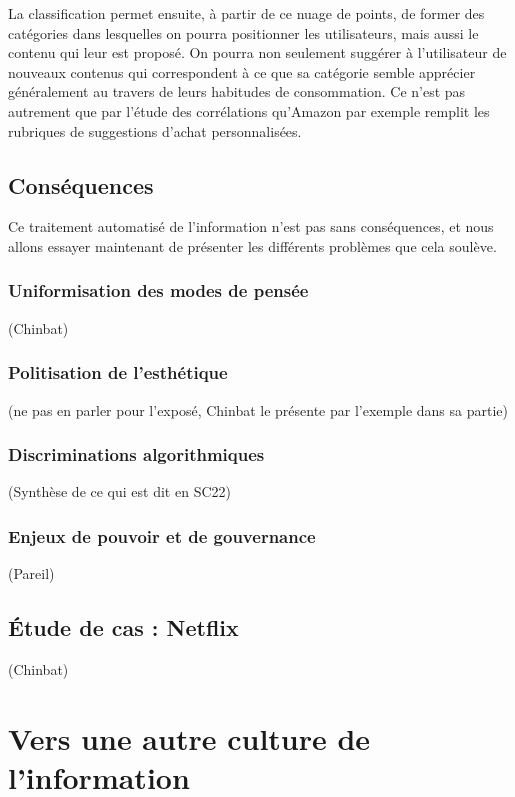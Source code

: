 \documentclass[a4paper,12pt]{report}
\begin{document}
La classification permet ensuite, à partir de ce nuage de points, de former des catégories dans lesquelles on pourra positionner les utilisateurs, mais aussi le contenu qui leur est proposé. On pourra non seulement suggérer à l'utilisateur de nouveaux contenus qui correspondent à ce que sa catégorie semble apprécier généralement au travers de leurs habitudes de consommation. Ce n'est pas autrement que par l'étude des corrélations qu'Amazon par exemple remplit les rubriques de suggestions d'achat personnalisées.

\section{Conséquences}

Ce traitement automatisé de l'information n'est pas sans conséquences, et nous allons essayer maintenant de présenter les différents problèmes que cela soulève.

\subsection{Uniformisation des modes de pensée}

(Chinbat)

\subsection{Politisation de l'esthétique}

(ne pas en parler pour l'exposé, Chinbat le présente par l'exemple dans sa partie)

\subsection{Discriminations algorithmiques}

(Synthèse de ce qui est dit en SC22)

\subsection{Enjeux de pouvoir et de gouvernance}

(Pareil)

\section{Étude de cas : Netflix}

(Chinbat)

\chapter{Vers une autre culture de l'information}
\end{document}
